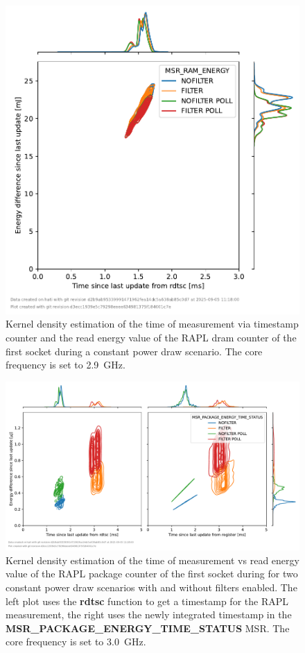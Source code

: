 \begin{figure}[]
    \centering
    \includegraphics[width=0.54\columnwidth]{fig/rapl-update-intervals/MSR_RAM_ENERGY_2900000.pdf}
    \caption{Kernel density estimation of the time of measurement via timestamp counter and the read energy value of the RAPL dram counter of the first socket during a constant power draw scenario.
    The core frequency is set to \SI{2.9}{\GHz}.}
\end{figure}

\clearpage
\begin{figure}[]
    \centering
    \includegraphics[width=\columnwidth]{fig/rapl-update-intervals/MSR_PACKAGE_ENERGY_TIME_STATUS_3000000.pdf}
    \caption{Kernel density estimation of the time of measurement vs read energy value of the RAPL package counter of the first socket during for two constant power draw scenarios with and without filters enabled.
    The left plot uses the \textbf{rdtsc} function to get a timestamp for the RAPL measurement, the right uses the newly integrated timestamp in the \textbf{MSR\_PACKAGE\_ENERGY\_TIME\_STATUS} MSR.
    The core frequency is set to \SI{3.0}{\GHz}.}
\end{figure}

